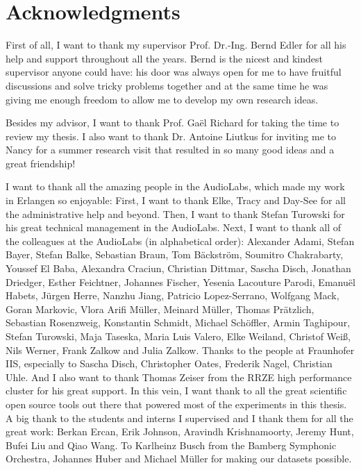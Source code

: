 
\bigskip

\begingroup
\let\clearpage\relax
\let\cleardoublepage\relax
\let\cleardoublepage\relax
\chapter*{Acknowledgments}
\begin{small}
First of all, I want to thank my supervisor Prof. Dr.-Ing. Bernd Edler for all his help and support throughout all the years. Bernd is the nicest and kindest supervisor anyone could have: his door was always open for me to have fruitful discussions and solve tricky problems together and at the same time he was giving me enough freedom to allow me to develop my own research ideas.

\bigskip

Besides my advisor, I want to thank Prof. Gaël Richard for taking the time to review my thesis.
I also want to thank Dr. Antoine Liutkus for inviting me to Nancy for a summer research visit that resulted in so many good ideas and a great friendship!

\bigskip

I want to thank all the amazing people in the AudioLabs, which made my work in Erlangen so enjoyable: First, I want to thank Elke, Tracy and Day-See for all the administrative help and beyond. Then, I want to thank Stefan Turowski for his great technical management in the AudioLabs. Next, I want to thank all of the colleagues at the AudioLabs (in alphabetical order): 
Alexander Adami, Stefan Bayer, Stefan Balke, Sebastian Braun, Tom Bäckström, Soumitro Chakrabarty, Youssef El Baba, Alexandra Craciun, Christian Dittmar, Sascha Disch, Jonathan Driedger, Esther Feichtner, Johannes Fischer, Yesenia Lacouture Parodi, Emanuël Habets, Jürgen Herre, Nanzhu Jiang, Patricio Lopez-Serrano, Wolfgang Mack, Goran Markovic, Vlora Arifi Müller, Meinard Müller, Thomas Prätzlich, Sebastian Rosenzweig, Konstantin Schmidt, Michael Schöffler, Armin Taghipour, Stefan Turowski, Maja Taseska, Maria Luis Valero, Elke Weiland, Christof Weiß, Nils Werner, Frank Zalkow and Julia Zalkow. Thanks to the people at Fraunhofer IIS, especially to Sascha Disch, Christopher Oates, Frederik Nagel, Christian Uhle.
And I also want to thank Thomas Zeiser from the RRZE high performance cluster for his great support.
In this vein, I want thank to all the great scientific open source tools out there that powered most of the experiments in this thesis.
A big thank to the students and interns I supervised and I thank them for all the great work: Berkan Ercan, Erik Johnson, Aravindh Krishnamoorty, Jeremy Hunt, Bufei Liu and Qiao Wang. 
To Karlheinz Busch from the Bamberg Symphonic Orchestra, Johannes Huber and Michael Müller for making our datasets possible. 


\end{small}
